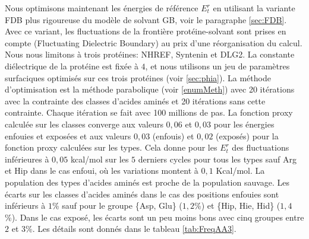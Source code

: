 Nous optimisons maintenant les énergies de référence $E_t^r$ en utilisant la variante FDB plus rigoureuse du modèle de solvant GB, voir le paragraphe \ref{sec:FDB}. Avec ce variant, les fluctuations de la frontière protéine-solvant sont prises en compte (\og Fluctuating Dielectric Boundary\fg) au prix d'une réorganisation du calcul. Nous nous limitons à trois protéines: NHREF, Syntenin et DLG2. La constante diélectrique de la protéine est fixée à $4$, et nous utilisons un jeu de paramètres surfaciques optimisés sur ces trois protéines (voir \ref{sec:phia}). La méthode d'optimisation est la méthode parabolique (voir \ref{enumMeth}) avec 20 itérations avec la contrainte des classes d'acides aminés et 20 itérations sans cette contrainte. Chaque itération se fait avec 100 millions de pas. La fonction proxy calculée sur les classes converge aux valeurs $0,06$ et $0,03$ pour les énergies enfouies et exposées et aux valeurs $0,03$ (enfouis) et $0,02$ (exposés) pour la fonction proxy calculées sur les types. Cela donne pour les $E_t^r$ des fluctuations inférieures à $0,05$ kcal/mol sur les $5$ derniers cycles pour tous les types sauf Arg et Hip dans le cas enfoui, où les variations montent à $0,1$ Kcal/mol. La population des types d'acides aminés est proche de la population sauvage. Les écarts sur les classes d'acides aminés dans le cas des positions enfouies sont inférieurs à $1$\%  sauf pour le groupe \{Asp, Glu\} ($1,2$\%)  et \{Hip, Hie, Hid\} ($1,4$\%). Dans le cas exposé, les écarts sont un peu moins bons avec cinq groupes entre $2$ et $3$\%. Les détails sont donnés dans le tableau \ref{tab:FreqAA3}.

